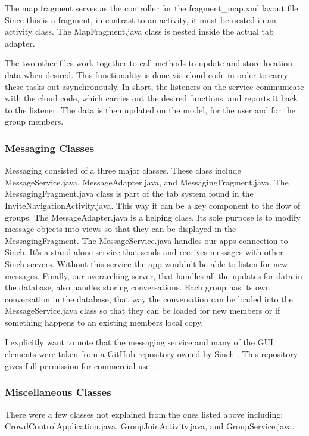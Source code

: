  	The map fragment serves as the controller for the fragment\_map.xml layout file. Since this is a fragment, in contrast to an activity, it must be nested in an activity class. The MapFragment.java class is nested inside the actual tab adapter. 
 	
 	The two other files work together to call methods to update and store location data when desired. This functionality is done via cloud code in order to carry these tasks out asynchronously. In short, the listeners on the service communicate with the cloud code, which carries out the desired functions, and reports it back to the listener. The data is then updated on the model, for the user and for the group members.
 	\subsubsection{Messaging Classes}
 Messaging consisted of a three major classes. These class include MessageService.java, MessageAdapter.java, and MessagingFragment.java. The MessagingFragment.java class is part of the tab system found in the InviteNavigationActivity.java. This way it can be a key component to the flow of groups. The MessageAdapter.java is a helping class. Its sole purpose is to modify message objects into views so that they can be displayed in the MessagingFragment. The MessageService.java handles our apps connection to Sinch. It's a stand alone service that sends and receives messages with other Sinch servers. Without this service the app wouldn't be able to listen for new messages. Finally, our overarching server, that handles all the updates for data in the database, also handles storing conversations. Each group has its own conversation in the database, that way the conversation can be loaded into the MessageService.java class so that they can be loaded for new members or if something happens to an existing members local copy.

I explicitly want to note that the messaging service and many of the GUI elements were taken from a GitHub repository owned by Sinch \cite{sinch:github}. This repository gives full permission for commercial use ~\cite{Choset: License, https://github.com/sinch/android-messaging-tutorial/blob/master/LICENSE}.

	\subsubsection{Miscellaneous Classes}
	There were a few classes not explained from the ones listed above including: CrowdControlApplication.java, GroupJoinActivity.java, and GroupService.java.
	
